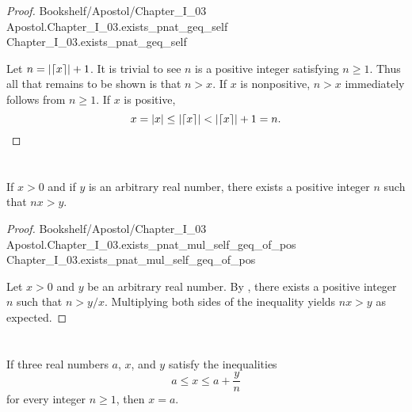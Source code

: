\documentclass{article}
\newcommand{\link}[1]{\lean{../..}
  {Bookshelf/Apostol/Chapter\_I\_03} %
  {Apostol.Chapter\_I\_03.#1} %
  {Chapter\_I\_03.#1} %
}
\begin{document}
\begin{proof}

  \link{exists\_pnat\_geq\_self}

  \divider

  Let $n = \left|\left\lceil x\right\rceil\right| + 1$.
  It is trivial to see $n$ is a positive integer satisfying $n \geq 1$.
  Thus all that remains to be shown is that $n > x$.
  If $x$ is nonpositive, $n > x$ immediately follows from $n \geq 1$.
  If $x$ is positive,
    $$x = \left|x\right| \leq \left|\left\lceil x\right\rceil\right| < \left|\left\lceil x\right\rceil\right| + 1 = n.$$

\end{proof}

\section*{}%
%

If $x > 0$ and if $y$ is an arbitrary real number, there exists a positive
  integer $n$ such that $nx > y$.


\begin{proof}

  \link{exists\_pnat\_mul\_self\_geq\_of\_pos}

  \divider

  Let $x > 0$ and $y$ be an arbitrary real number.
  By , there exists a positive integer $n$ such that
    $n > y / x$.
  Multiplying both sides of the inequality yields $nx > y$ as expected.

\end{proof}

\section*{}%
%

If three real numbers $a$, $x$, and $y$ satisfy the inequalities
  $$a \leq x \leq a + \frac{y}{n}$$ for every integer $n \geq 1$, then $x = a$.
\end{document}
